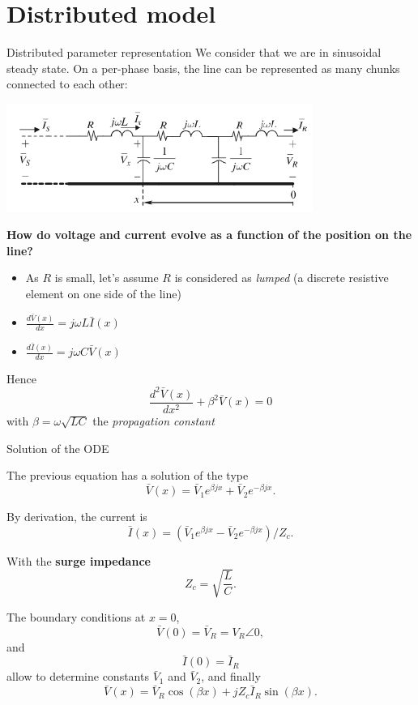 \section{Distributed model}
\begin{frame}[allowframebreaks]{Distributed parameter representation}
    We consider that we are in sinusoidal steady state. 
    On a per-phase basis, the line can be represented as many chunks connected to each other:  
    \begin{center}
        \includegraphics[width=0.75\textwidth]{images/TL_distributed.png}
    \end{center}
    \textbf{How do voltage and current evolve as a function of the position on the line?}

    \begin{itemize}
        \item As $R$ is small, let's assume $R$ is considered as \textit{lumped} (a discrete resistive element on one side of the line)
        \item $\frac{d\bar{V}(x)}{dx} = j\omega L \bar{I}(x)$
        \item $\frac{d\bar{I}(x)}{dx} = j\omega C \bar{V}(x)$
    \end{itemize}

    Hence $$\frac{d^2\bar{V}(x)}{dx^2} + \beta^2 \bar{V}(x) = 0$$
    with $\beta = \omega \sqrt{LC}$ the \textit{propagation constant}
\end{frame}
\begin{frame}[allowframebreaks]{Solution of the ODE}

    The previous equation has a solution of the type 
    $$\bar{V}(x) = \bar{V}_1 e^{\beta j x} + \bar{V}_2 e^{-\beta j x}.$$
    
        
    By derivation, the current is  $$\bar{I}(x) = (\bar{V}_1 e^{\beta j x} - \bar{V}_2 e^{-\beta j x}) / Z_c.$$
    
    With the \textbf{surge impedance} $$Z_c = \sqrt{\frac{L}{C}}.$$
    
    The boundary conditions at $x=0$, $$\bar{V}(0) = \bar{V}_R = V_R \angle 0,$$  and $$\bar{I}(0) = \bar{I}_R$$
    allow to determine constants $\bar{V}_1$ and $\bar{V}_2$, and finally
    $$
    \bar{V}(x) = \bar{V}_R \cos(\beta x) + j Z_c \bar{I}_R \sin(\beta x).
    $$
\end{frame}

